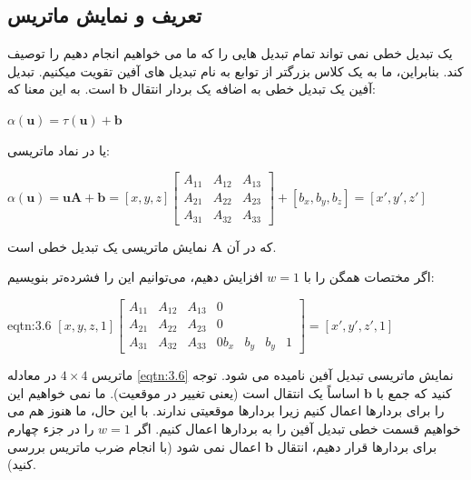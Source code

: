 \subsection{\textbf{تعریف و نمایش ماتریس}}
{
    \Large
    \begin{spacing}{1.5}
        یک تبدیل خطی نمی تواند تمام تبدیل هایی را که ما می خواهیم انجام دهیم را توصیف کند.
        بنابراین، ما به یک کلاس بزرگتر از توابع به نام تبدیل های آفین تقویت میکنیم.
        تبدیل آفین یک تبدیل خطی به اضافه یک بردار انتقال $\textbf{b}$ است. به این معنا که:

        \begin{center}
            $\alpha(\textbf{u})=\tau(\textbf{u})+\textbf{b}$
        \end{center}

        یا در نماد ماتریسی:

        \begin{center}
            $\alpha(\textbf{u})=\textbf{uA}+\textbf{b}=[x, y, z]\begin{bmatrix}
                                                                    A_{11} & A_{12} & A_{13} \\
                                                                    A_{21} & A_{22} & A_{23} \\
                                                                    A_{31} & A_{32} & A_{33}
            \end{bmatrix}+[b_{x},b_{y},b_{z}]=[x\prime,y\prime,z\prime]$
        \end{center}

        که در آن $\textbf{A}$ نمایش ماتریسی یک تبدیل خطی است.

        اگر مختصات همگن را با $w=1$ افزایش دهیم، می‌توانیم این را فشرده‌تر بنویسیم:

        \begin{eqtn}{eqtn:3.6}
            \centering
            $[x, y, z, 1]\begin{bmatrix}
                             A_{11} & A_{12} & A_{13} & 0 \\
                             A_{21} & A_{22} & A_{23} & 0 \\
                             A_{31} & A_{32} & A_{33} & 0
                             b_{x} & b_{y} & b_{y} & 1
            \end{bmatrix}=[x\prime, y\prime, z\prime,1]$
        \end{eqtn}

        ماتریس $4\times 4$ در معادله \ref{eqtn:3.6} نمایش ماتریسی تبدیل آفین نامیده می شود.
        توجه کنید که جمع با $\textbf{b}$ اساساً یک انتقال است (یعنی تغییر در موقعیت).
        ما نمی خواهیم این را برای بردارها اعمال کنیم زیرا بردارها موقعیتی ندارند.
        با این حال، ما هنوز هم می خواهیم قسمت خطی تبدیل آفین را به بردارها اعمال کنیم.
        اگر $w=1$ را در جزء چهارم برای بردارها قرار دهیم، انتقال $\textbf{b}$ اعمال نمی شود (با انجام ضرب ماتریس بررسی کنید).


\end{spacing}}

